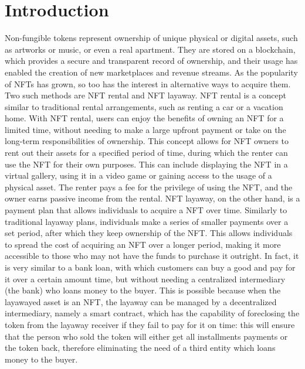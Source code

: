 \documentclass[english, LaM, oneside]{sapthesis}%
\begin{document}
\chapter{Introduction}
\lettrine[lines=2, findent=3pt, nindent=0pt]{N}{}on-fungible tokens represent ownership of unique physical or digital assets, such as artworks or music, or even a real apartment. They are stored on a blockchain, which provides a secure and transparent record of ownership, and their usage has enabled the creation of new marketplaces and revenue streams. As the popularity of NFTs has grown, so too has the interest in alternative ways to acquire them. Two such methods are NFT rental and NFT layaway.
NFT rental is a concept similar to traditional rental arrangements, such as renting a car or a vacation home. With NFT rental, users can enjoy the benefits of owning an NFT for a limited time, without needing to make a large upfront payment or take on the long-term responsibilities of ownership.
This concept allows for NFT owners to rent out their assets for a specified period of time, during which the renter can use the NFT for their own purposes. This can include displaying the NFT in a virtual gallery, using it in a video game or gaining access to the usage of a physical asset. The renter pays a fee for the privilege of using the NFT, and the owner earns passive income from the rental.\newline
NFT layaway, on the other hand, is a payment plan that allows individuals to acquire a NFT over time. Similarly to traditional layaway plans, individuals make a series of smaller payments over a set period, after which they keep ownership of the NFT. This allows individuals to spread the cost of acquiring an NFT over a longer period, making it more accessible to those who may not have the funds to purchase it outright. In fact, it is very similar to a bank loan, with which customers can buy a good and pay for it over a certain amount time, but without needing a centralized intermediary (the bank) who loans money to the buyer. This is possible because when the layawayed asset is an NFT, the layaway can be managed by a decentralized intermediary, namely a smart contract, which has the capability of foreclosing the token from the layaway receiver if they fail to pay for it on time: this will ensure that the person who sold the token will either get all installments payments or the token back, therefore eliminating the need of a third entity which loans money to the buyer.\newline
\end{document}
